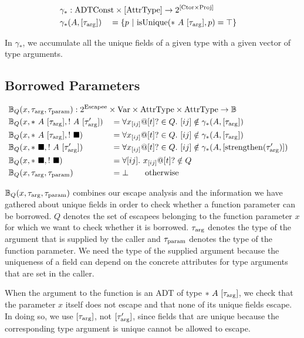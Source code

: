 \begin{alignat*}{3}
	\gamma_* &: \mathrlap{\ADTConst \times [\AttrType] \to 2^{[\Ctor \times \Proj]}} \\
	\gamma_*&(A, [\tau_\arrg]) &&= \left\{ p \ |\ \isUnique(*\ A\ [\tau_\arrg], p) = \top \right\}
\end{alignat*}

In $\gamma_*$, we accumulate all the unique fields of a given type with a given vector of type arguments.

\subsection{Borrowed Parameters}
\begin{alignat*}{3}
	&\mathbb{B}_Q(x, \tau_\arrg, \tau_\param) : \mathrlap{2^\Escapee \times \Var \times \AttrType \times \AttrType \to \mathbb{B}} \\
	&\mathbb{B}_Q(x, *\ A\ [\tau_\arrg], !\ A\ [\tau_\arrg']) &&= \forall x_{[ij]}@[t]? \in Q.\ [ij] \notin \gamma_*(A, [\tau_\arrg]) \\
	&\mathbb{B}_Q(x, *\ A\ [\tau_\arrg], !\ \blacksquare) &&= \forall x_{[ij]}@[t]? \in Q.\ [ij] \notin \gamma_*(A, [\tau_\arrg]) \\
	&\mathbb{B}_Q(x, *\ \blacksquare, !\ A\ [\tau_\arrg']) &&= \forall x_{[ij]}@[t]? \in Q.\ [ij] \notin \gamma_*(A, [\strengthen(\tau_\arrg')]) \\
	&\mathbb{B}_Q(x, *\ \blacksquare, !\ \blacksquare) &&= \forall [ij].\ x_{[ij]}@[t]? \notin Q \\
	&\mathbb{B}_Q(x, \tau_\arrg, \tau_\param) &&= \bot \qquad\text{otherwise}
\end{alignat*}

$\mathbb{B}_Q(x, \tau_{\mathrm{arg}}, \tau_{\mathrm{param}})$ combines our escape analysis and the information we have gathered about unique fields in order to check whether a function parameter can be borrowed. $Q$ denotes the set of escapees belonging to the function parameter $x$ for which we want to check whether it is borrowed. $\tau_{\mathrm{arg}}$ denotes the type of the argument that is supplied by the caller and $\tau_{\mathrm{param}}$ denotes the type of the function parameter. We need the type of the supplied argument because the uniqueness of a field can depend on the concrete attributes for type arguments that are set in the caller.

When the argument to the function is an ADT of type $*\ A\ [\tau_{\mathrm{arg}}]$, we check that the parameter $x$ itself does not escape and that none of its unique fields escape. In doing so, we use $[\tau_{\mathrm{arg}}]$, not $[\tau_{\mathrm{arg}}']$, since fields that are unique because the corresponding type argument is unique cannot be allowed to escape. 

